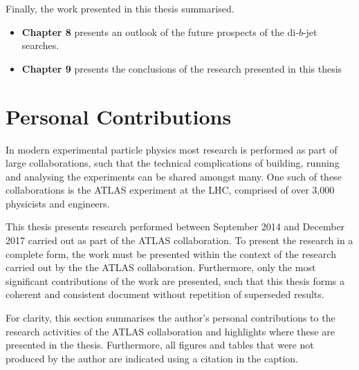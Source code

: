 \noindent
  Finally, the work presented in this thesis summarised.
  \begin{itemize}[leftmargin=*]
\item\textbf{Chapter 8} presents an outlook of the future prospects of the di-$b$-jet searches.\vspace{0.5em}
\item\textbf{Chapter 9} presents the conclusions of the research presented in this thesis\vspace{0.5em}
\end{itemize}
\clearpage
\section{Personal Contributions}

In modern experimental particle physics most research is performed as part of large collaborations,
such that the technical complications of building, running and analysing the experiments can be shared amongst many.
One such of these collaborations is the ATLAS experiment at the LHC, comprised of over 3,000 physicists and engineers.

This thesis presents research performed between September 2014 and December 2017 carried out as part of the ATLAS collaboration.
To present the research in a complete form, the work must be presented within the context of the research carried out by the the ATLAS collaboration.
Furthermore, only the most significant contributions of the work are presented,
such that this thesis forms a coherent and consistent document without repetition of superseded results.

For clarity, this section summarises the author's personal contributions to the research activities of the ATLAS collaboration
and highlights where these are presented in the thesis.
Furthermore, all figures and tables that were not produced by the author are indicated using a citation in the caption.


